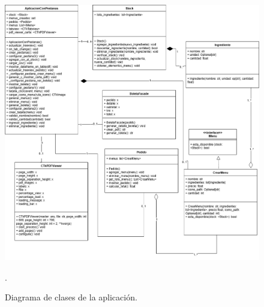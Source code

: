 \documentclass[a4paper,12pt]{article}
\begin{document}
\begin{figure}[H]
    \centering
    \includegraphics[width=1.1\textwidth]{Diagrama-Restaurante.drawio.png}
    \caption{Diagrama de clases de la aplicación.}.
\end{figure}
\end{document}
